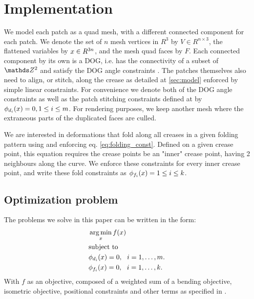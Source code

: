 \section{Implementation} \label{sec:implementation}
We model each patch as a quad mesh, with a different connected component for each patch. We denote the set of $n$ mesh vertices in $R^3$ by $V \in R^{n\times3}$, the flattened variables by $x \in R^{3n}$, and the mesh quad faces by $F$. Each connected component by its own is a DOG, i.e. has the connectivity of a subset of $\Z^2$ and satisfy the DOG angle constraints \cite{rabi18}. The patches themselves also need to align, or stitch, along the crease as detailed at \ref{sec:model} enforced by simple linear constraints. For convenience we denote both of the DOG angle constraints as well as the patch stitching constraints defined at \cite{rabi2018shape} by $\phi_{d_i}(x) = 0, 1 \leq i \leq m$. For rendering purposes, we keep another mesh where the extraneous parts of the duplicated faces are culled. 

We are interested in deformations that fold along all creases in a given folding pattern using  and enforcing eq. \eqref{eq:folding_const}. Defined on a given crease point, this equation requires the crease points be an "inner" crease point, having 2 neighbours along the curve. We enforce these constraints for every inner crease point, and write these fold constraints as $\phi_{f_i}(x) = 1 \leq i \leq k$.

\subsection{Optimization problem}
The problems we solve in this paper can be written in the form:
\begin{equation} \label{eq:const_opt}
\begin{aligned}
& \operatorname*{arg\,min}_x f(x) \\
& \textrm{subject to} \\
& \phi_{d_i}(x) = 0, \ \  i = 1, \ldots, m. \\
& \phi_{f_i}(x) = 0, \ \  i = 1, \ldots, k.
\end{aligned}
\end{equation}
With $f$ as an objective, composed of a weighted sum of a bending objective, isometric objective, positional constraints and other terms as specified in .

